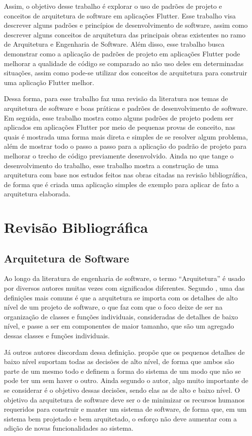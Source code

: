 \documentclass[12pt, %
openright, 
oneside, %
a4paper,    %
brazil]{facom-ufu-abntex2}
\begin{document}
Assim, o objetivo desse trabalho é explorar o uso de padrões de projeto e conceitos de arquitetura de software em aplicações Flutter. Esse trabalho visa descrever alguns padrões e princípios de desenvolvimento de software, assim como descrever alguns conceitos de arquitetura das principais obras existentes no ramo de Arquitetura e Engenharia de Software. Além disso, esse trabalho busca demonstrar como a aplicação de padrões de projeto em aplicações Flutter pode melhorar a qualidade de código se comparado ao não uso deles em determinadas situações, assim como pode-se utilizar dos conceitos de arquitetura para construir uma aplicação Flutter melhor.

Dessa forma, para esse trabalho faz uma revisão da literatura nos temas de arquitetura de software e boas práticas e padrões de desenvolvimento de software. Em seguida, esse trabalho mostra como alguns padrões de projeto podem ser aplicados em aplicações Flutter por meio de pequenas provas de conceito, nas quais é mostrada uma forma mais direta e simples de se resolver algum problema, além de mostrar todo o passo a passo para a aplicação do padrão de projeto para melhorar o trecho de código previamente desenvolvido. Ainda no que tange o desenvolvimento do trabalho, esse trabalho mostra a construção de uma arquitetura com base nos estudos feitos nas obras citadas na revisão bibliográfica, de forma que é criada uma aplicação simples de exemplo para aplicar de fato a arquitetura elaborada.

\chapter{Revisão Bibliográfica} \label{chapt:bibliography}

\section{Arquitetura de Software}
Ao longo da literatura de engenharia de software, o termo ``Arquitetura'' é usado por diversos autores muitas vezes com significados diferentes. Segundo , uma das definições mais comuns é que a arquitetura se importa com os detalhes de alto nível de um projeto de software, o que faz com que o foco deixe de ser na organização de classes e funções individuais, consideradas de detalhes de baixo nível, e passe a ser em componentes de maior tamanho, que são um agregado dessas classes e funções individuais.

Já outros autores discordam dessa definição.  propõe que os pequenos detalhes de baixo nível suportam todas as decisões de alto nível, de forma que ambos são parte de um mesmo todo e definem a forma do sistema de um modo que não se pode ter um sem haver o outro. Ainda segundo o autor, algo muito importante de se considerar é o objetivo dessas decisões, sendo elas as de alto e baixo nível. O objetivo da arquitetura de software deve ser o de minimizar os recursos humanos requeridos para construir e manter um sistema de software, de forma que, em um sistema bem projetado e bem arquitetado, o esforço não deve aumentar com a adição de novas funcionalidades ao sistema.
\end{document}
